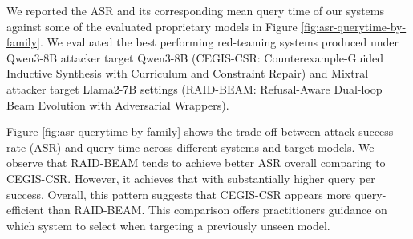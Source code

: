 We reported the ASR and its corresponding mean query time of our systems against some of the evaluated proprietary models in Figure \ref{fig:asr-querytime-by-family}. We evaluated the best performing red-teaming systems produced under Qwen3-8B attacker target Qwen3-8B (CEGIS-CSR: Counterexample-Guided Inductive Synthesis with Curriculum and Constraint Repair) and Mixtral attacker target Llama2-7B settings (RAID-BEAM: Refusal-Aware Dual-loop Beam Evolution with Adversarial Wrappers). 

Figure \ref{fig:asr-querytime-by-family} shows the trade-off between attack success rate (ASR) and query time across different systems and target models. We observe that RAID-BEAM tends to achieve better ASR overall comparing to CEGIS-CSR. However, it achieves that with substantially higher query per success. Overall, this pattern suggests that CEGIS-CSR appears more query-efficient than RAID-BEAM. This comparison offers practitioners guidance on which system to select when targeting a previously unseen model.



